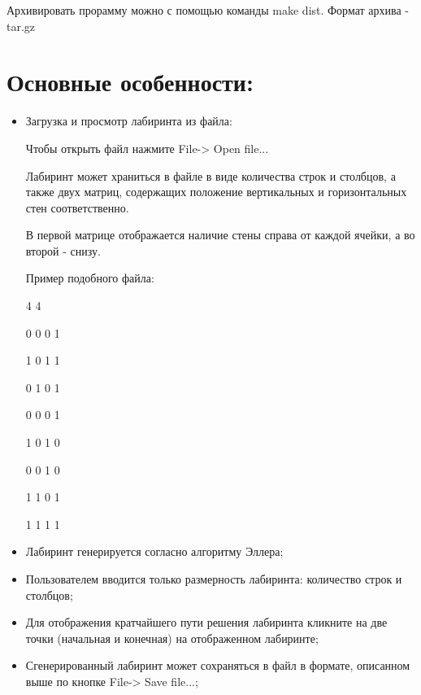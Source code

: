 \documentclass{report}
\begin{document}
Архивировать прорамму можно с помощью команды make dist. Формат архива - tar.gz

\section* {\bfseries Основные особенности:}
\begin{itemize}
\item Загрузка и просмотр лабиринта из файла:

Чтобы открыть файл нажмите File-> Open file...

Лабиринт может храниться в файле в виде количества строк и столбцов, а также двух матриц, содержащих положение вертикальных и горизонтальных стен соответственно.

В первой матрице отображается наличие стены справа от каждой ячейки, а во второй - снизу.

Пример подобного файла:


4 4

0 0 0 1

1 0 1 1

0 1 0 1

0 0 0 1



1 0 1 0

0 0 1 0

1 1 0 1

1 1 1 1


\item  Лабиринт генерируется  согласно алгоритму Эллера;

\item Пользователем вводится только размерность лабиринта: количество строк и столбцов;

\item Для отображения кратчайшего пути решения лабиринта кликните на две точки (начальная и конечная) на отображенном лабиринте;

\item Сгенерированный лабиринт может сохраняться в файл в формате, описанном выше по кнопке File-> Save file...;
\end{itemize}
\end{document}
